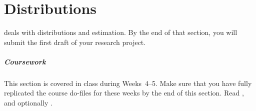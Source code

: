 %
%
\chapter{Distributions}%
	\label{ch:distr}%
  \begin{mybox}
     deals with distributions and estimation. By the end of that section, you will submit the first draft of your research project.%
    \paragraph{Coursework} %
    This section is covered in class during Weeks~4--5. Make sure that you have fully replicated the course do-files for these weeks by the end of this section. Read  \citeauthor[ch.~4--7]{Urdan:2010a}, and optionally \citeauthor[ch.~2.5--2.6 and 5]{FeinsteinThomas:2002d}.%
  \end{mybox}\\[4em]%
  \startcontents[chapters]%
	\newpage

%
%


\stopcontents[chapters]

%
%
